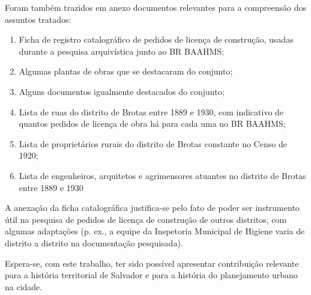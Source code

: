 Foram também trazidos em anexo documentos relevantes para a compreensão dos assuntos tratados:

\begin{enumerate}
\item Ficha de registro catalográfico de pedidos de licença de construção, usadas durante a pesquisa arquivística junto ao BR BAAHMS;
\item Algumas plantas de obras que se destacaram do conjunto;
\item Alguns documentos igualmente destacados do conjunto;
\item Lista de ruas do distrito de Brotas entre 1889 e 1930, com indicativo de quantos pedidos de licença de obra há para cada uma no BR BAAHMS;
\item Lista de proprietários rurais do distrito de Brotas constante no Censo de 1920;
\item Lista de engenheiros, arquitetos e agrimensores atuantes no distrito de Brotas entre 1889 e 1930
\end{enumerate}

A anexação da ficha catalográfica justifica-se pelo fato de poder ser instrumento útil na pesquisa de pedidos de licença de construção de outros distritos, com algumas adaptações (p. ex., a equipe da Inspetoria Municipal de Higiene varia de distrito a distrito na documentação pesquisada).

Espera-se, com este trabalho, ter sido possível apresentar contribuição relevante para a história territorial de Salvador e para a história do planejamento urbano na cidade.

